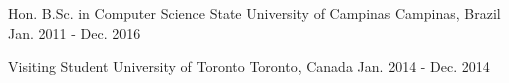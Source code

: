

\begin{cventries}

  \cventry
    {Hon. B.Sc. in Computer Science} %
    {State University of Campinas} %
    {Campinas, Brazil} %
    {Jan. 2011 - Dec. 2016} %
    {}

  \cventry
    {Visiting Student} %
    {University of Toronto} %
    {Toronto, Canada} %
    {Jan. 2014 - Dec. 2014} %
    {}

\end{cventries}
